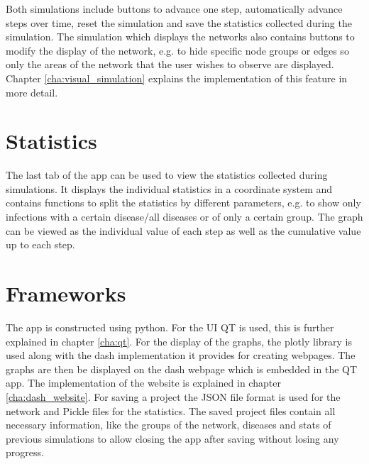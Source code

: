 Both simulations include buttons to advance one step, automatically advance steps over time,
reset the simulation and save the statistics collected during the simulation. The simulation
which displays the networks also contains buttons to modify the display of the network, e.g. to hide specific node groups or edges so only the areas of the network that the user wishes to observe are displayed.
Chapter \ref{cha:visual_simulation} explains the implementation of this feature in more detail.

\section{Statistics}
The last tab of the app can be used to view the statistics collected during simulations.
It displays the individual statistics in a coordinate system and contains functions to split
the statistics by different parameters, e.g. to show only infections with a certain disease/all
diseases or of only a certain group. The graph can be viewed as the individual value of each
step as well as the cumulative value up to each step.

\section{Frameworks}
The app is constructed using python. For the UI QT \cite{qt} is used, this is further explained
in chapter \ref{cha:qt}.
For the display of the graphs, the plotly \cite{plotly} library is used along with the dash implementation it provides for creating webpages. The graphs are then be displayed on the dash webpage which is embedded in the QT app. The implementation of the website is explained in chapter \ref{cha:dash_website}.
For saving a project the JSON file format is used for the network and Pickle files for the statistics. The saved project files contain all 
necessary information, like the groups of the network, diseases and stats of previous simulations
to allow closing the app after saving without losing any progress.

